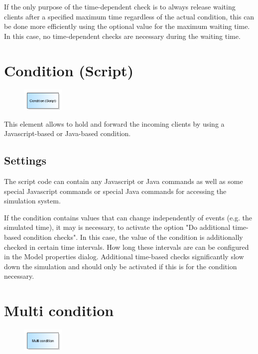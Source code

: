 If the only purpose of the time-dependent check is to always release waiting clients after a specified maximum time
regardless of the actual condition, this can be done more efficiently using the optional value for the maximum waiting time.
In this case, no time-dependent checks are necessary during the waiting time.


\section{Condition (Script)}
\label{ref:ModelElementHoldJS}

\begin{figure}
\vspace{-22pt}
\includegraphics[width=2cm]{imageModelElementHoldJS.png}
\vspace{-22pt}
\end{figure}

This element allows to hold and forward the incoming clients by using a
Javascript-based or Java-based condition.

\subsection*{Settings}

The script code can contain any Javascript or Java commands as well as some
special Javascript commands or special Java commands 
for accessing the simulation system.

If the condition contains values that can change independently of events (e.g. the simulated time),
it may is necessary, to activate the option "Do additional time-based condition checks". In this case,
the value of the condition is additionally checked in certain time intervals. How long these intervals
are can be configured in the Model properties dialog.
Additional time-based checks significantly slow down the simulation and should only be activated
if this is for the condition necessary.


\section{Multi condition}
\label{ref:ModelElementHoldMulti}

\begin{figure}
\vspace{-22pt}
\includegraphics[width=2cm]{imageModelElementHoldMulti.png}
\vspace{-22pt}
\end{figure}

